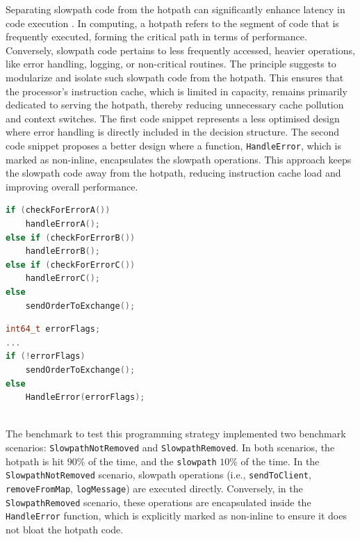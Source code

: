 \documentclass{article}
\theoremstyle{break}
\begin{document}
Separating slowpath code from the hotpath can significantly enhance latency in code execution \cite{8}. In computing, a hotpath refers to the segment of code that is frequently executed, forming the critical path in terms of performance. Conversely, slowpath code pertains to less frequently accessed, heavier operations, like error handling, logging, or non-critical routines. The principle suggests to modularize and isolate such slowpath code from the hotpath. This ensures that the processor's instruction cache, which is limited in capacity, remains primarily dedicated to serving the hotpath, thereby reducing unnecessary cache pollution and context switches.  The first code snippet represents a less optimised design where error handling is directly included in the decision structure. The second code snippet proposes a better design where a function, \texttt{HandleError}, which is marked as non-inline, encapsulates the slowpath operations. This approach keeps the slowpath code away from the hotpath, reducing instruction cache load and improving overall performance.



\begin{minipage}{.45\textwidth}
    \begin{lstlisting}[language=C++, title=Snippet 1: Bad design]
if (checkForErrorA())
    handleErrorA();
else if (checkForErrorB())
    handleErrorB();
else if (checkForErrorC())
    handleErrorC();
else
    sendOrderToExchange();
    \end{lstlisting}
  \end{minipage}\hfill%
  \begin{minipage}{.45\textwidth}
    \begin{lstlisting}[language=C++, title=Snippet 2: Good design]
int64_t errorFlags;
...
if (!errorFlags)
    sendOrderToExchange();
else
    HandleError(errorFlags);
\end{lstlisting} 
\end{minipage}\\

The benchmark to test this programming strategy implemented two benchmark scenarios: \texttt{SlowpathNotRemoved} and \texttt{SlowpathRemoved}. In both scenarios, the hotpath is hit \(90\%\) of the time, and the \texttt{slowpath} \(10\%\) of the time. In the \texttt{SlowpathNotRemoved} scenario, slowpath operations (i.e., \texttt{sendToClient}, \texttt{remove\-FromMap}, \texttt{logMessage}) are executed directly. Conversely, in the \texttt{SlowpathRemoved} scenario, these operations are encapsulated inside the \texttt{HandleError} function, which is explicitly marked as non-inline to ensure it does not bloat the hotpath code.
\end{document}
